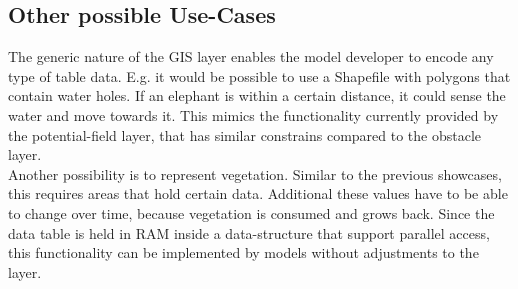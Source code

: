 \subsection{Other possible Use-Cases}
The generic nature of the GIS layer enables the model developer to encode any type of table data. E.g. it would be possible to use a Shapefile with polygons that contain water holes. If an elephant is within a certain distance, it could sense the water and move towards it. This mimics the functionality currently provided by the potential-field layer, that has similar constrains compared to the obstacle layer.\\
Another possibility is to represent vegetation. Similar to the previous showcases, this requires areas that hold certain data. Additional these values have to be able to change over time, because vegetation is consumed and grows back. Since the data table is held in RAM inside a data-structure that support parallel access, this functionality can be implemented by models without adjustments to the layer.
